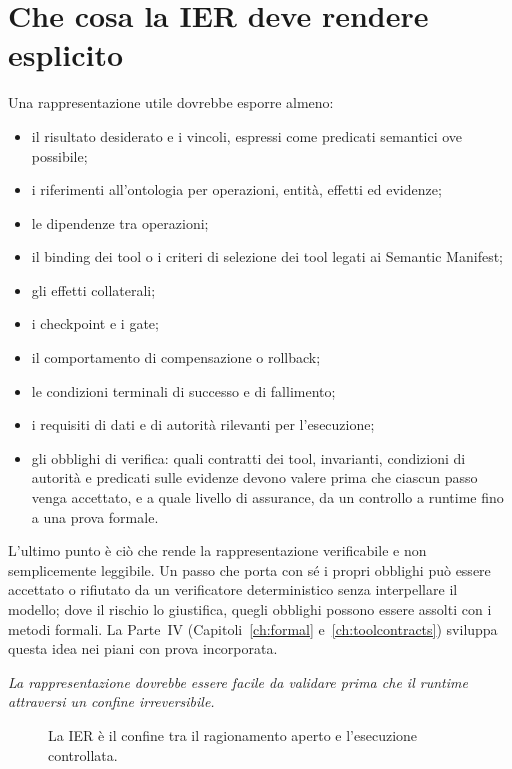 \documentclass[10pt,oneside,openany]{book}
\begin{document}
\section{Che cosa la IER deve rendere esplicito}
Una rappresentazione utile dovrebbe esporre almeno:

\begin{itemize}
\item il risultato desiderato e i vincoli, espressi come predicati semantici ove possibile;
\item i riferimenti all'ontologia per operazioni, entità, effetti ed evidenze;
\item le dipendenze tra operazioni;
\item il binding dei tool o i criteri di selezione dei tool legati ai Semantic Manifest;
\item gli effetti collaterali;
\item i checkpoint e i gate;
\item il comportamento di compensazione o rollback;
\item le condizioni terminali di successo e di fallimento;
\item i requisiti di dati e di autorità rilevanti per l'esecuzione;
\item gli obblighi di verifica: quali contratti dei tool, invarianti, condizioni di autorità e predicati sulle evidenze devono valere prima che ciascun passo venga accettato, e a quale livello di assurance, da un controllo a runtime fino a una prova formale.
\end{itemize}

L'ultimo punto è ciò che rende la rappresentazione verificabile e non semplicemente leggibile. Un passo che porta con sé i propri obblighi può essere accettato o rifiutato da un verificatore deterministico senza interpellare il modello; dove il rischio lo giustifica, quegli obblighi possono essere assolti con i metodi formali. La Parte~IV (Capitoli~\ref{ch:formal} e~\ref{ch:toolcontracts}) sviluppa questa idea nei piani con prova incorporata.

\emph{La rappresentazione dovrebbe essere facile da validare prima che il runtime attraversi un confine irreversibile.}

\begin{figure}[ht]
\centering
{}
\caption{La IER è il confine tra il ragionamento aperto e l'esecuzione controllata.}
\end{figure}
\end{document}
